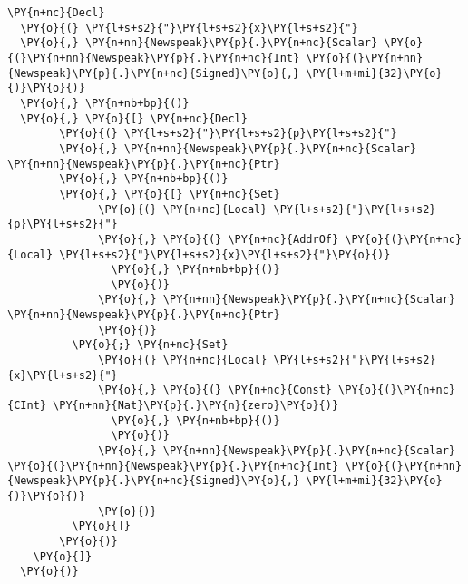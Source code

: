 \begin{Verbatim}[commandchars=\\\{\}]
\PY{n+nc}{Decl}
  \PY{o}{(} \PY{l+s+s2}{"}\PY{l+s+s2}{x}\PY{l+s+s2}{"}
  \PY{o}{,} \PY{n+nn}{Newspeak}\PY{p}{.}\PY{n+nc}{Scalar} \PY{o}{(}\PY{n+nn}{Newspeak}\PY{p}{.}\PY{n+nc}{Int} \PY{o}{(}\PY{n+nn}{Newspeak}\PY{p}{.}\PY{n+nc}{Signed}\PY{o}{,} \PY{l+m+mi}{32}\PY{o}{)}\PY{o}{)}
  \PY{o}{,} \PY{n+nb+bp}{()}
  \PY{o}{,} \PY{o}{[} \PY{n+nc}{Decl}
        \PY{o}{(} \PY{l+s+s2}{"}\PY{l+s+s2}{p}\PY{l+s+s2}{"}
        \PY{o}{,} \PY{n+nn}{Newspeak}\PY{p}{.}\PY{n+nc}{Scalar} \PY{n+nn}{Newspeak}\PY{p}{.}\PY{n+nc}{Ptr}
        \PY{o}{,} \PY{n+nb+bp}{()}
        \PY{o}{,} \PY{o}{[} \PY{n+nc}{Set}
              \PY{o}{(} \PY{n+nc}{Local} \PY{l+s+s2}{"}\PY{l+s+s2}{p}\PY{l+s+s2}{"}
              \PY{o}{,} \PY{o}{(} \PY{n+nc}{AddrOf} \PY{o}{(}\PY{n+nc}{Local} \PY{l+s+s2}{"}\PY{l+s+s2}{x}\PY{l+s+s2}{"}\PY{o}{)}
                \PY{o}{,} \PY{n+nb+bp}{()}
                \PY{o}{)}
              \PY{o}{,} \PY{n+nn}{Newspeak}\PY{p}{.}\PY{n+nc}{Scalar} \PY{n+nn}{Newspeak}\PY{p}{.}\PY{n+nc}{Ptr}
              \PY{o}{)}
          \PY{o}{;} \PY{n+nc}{Set}
              \PY{o}{(} \PY{n+nc}{Local} \PY{l+s+s2}{"}\PY{l+s+s2}{x}\PY{l+s+s2}{"}
              \PY{o}{,} \PY{o}{(} \PY{n+nc}{Const} \PY{o}{(}\PY{n+nc}{CInt} \PY{n+nn}{Nat}\PY{p}{.}\PY{n}{zero}\PY{o}{)}
                \PY{o}{,} \PY{n+nb+bp}{()}
                \PY{o}{)}
              \PY{o}{,} \PY{n+nn}{Newspeak}\PY{p}{.}\PY{n+nc}{Scalar} \PY{o}{(}\PY{n+nn}{Newspeak}\PY{p}{.}\PY{n+nc}{Int} \PY{o}{(}\PY{n+nn}{Newspeak}\PY{p}{.}\PY{n+nc}{Signed}\PY{o}{,} \PY{l+m+mi}{32}\PY{o}{)}\PY{o}{)}
              \PY{o}{)}
          \PY{o}{]}
        \PY{o}{)}
    \PY{o}{]}
  \PY{o}{)}
\end{Verbatim}

